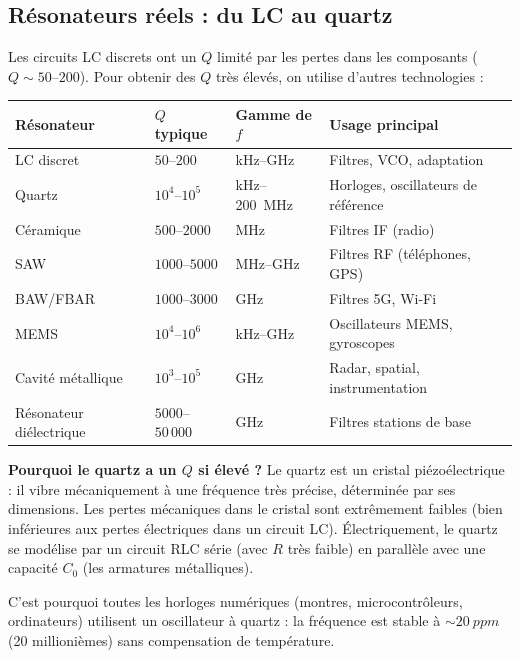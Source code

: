 \documentclass[12pt,a4paper,twoside]{book}
\begin{document}
\subsection{Résonateurs réels : du LC au quartz}

Les circuits LC discrets ont un $Q$ limité par les pertes dans les composants ($Q \sim 50$--$200$). Pour obtenir des $Q$ très élevés, on utilise d'autres technologies :

\begin{center}
\renewcommand{\arraystretch}{1.3}
\begin{tabular}{llll}
\toprule
\textbf{Résonateur} & \textbf{$Q$ typique} & \textbf{Gamme de $f$} & \textbf{Usage principal} \\
\midrule
LC discret & $50$--$200$ & kHz--GHz & Filtres, VCO, adaptation \\
Quartz & $10^4$--$10^5$ & kHz--\SI{200}{MHz} & Horloges, oscillateurs de référence \\
Céramique & $500$--$2000$ & MHz & Filtres IF (radio) \\
SAW & $1000$--$5000$ & MHz--GHz & Filtres RF (téléphones, GPS) \\
BAW/FBAR & $1000$--$3000$ & GHz & Filtres 5G, Wi-Fi \\
MEMS & $10^4$--$10^6$ & kHz--GHz & Oscillateurs MEMS, gyroscopes \\
Cavité métallique & $10^3$--$10^5$ & GHz & Radar, spatial, instrumentation \\
Résonateur diélectrique & $5000$--$50\,000$ & GHz & Filtres stations de base \\
\bottomrule
\end{tabular}
\end{center}

\begin{intuition}
\textbf{Pourquoi le quartz a un $Q$ si élevé ?} Le quartz est un cristal piézoélectrique : il vibre mécaniquement à une fréquence très précise, déterminée par ses dimensions. Les pertes mécaniques dans le cristal sont extrêmement faibles (bien inférieures aux pertes électriques dans un circuit LC). Électriquement, le quartz se modélise par un circuit RLC série (avec $R$ très faible) en parallèle avec une capacité $C_0$ (les armatures métalliques).

C'est pourquoi toutes les horloges numériques (montres, microcontrôleurs, ordinateurs) utilisent un oscillateur à quartz : la fréquence est stable à $\sim\SI{20}{ppm}$ (20 millionièmes) sans compensation de température.
\end{intuition}
\end{document}
